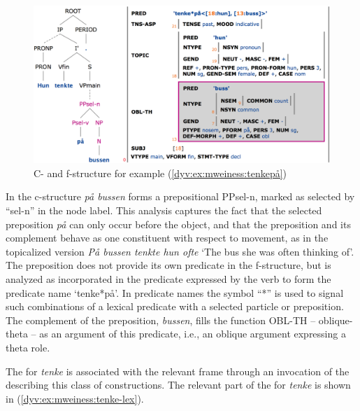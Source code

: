 \documentclass[output=paper]{langsci/langscibook}
\begin{document}
\begin{figure}
  \includegraphics[width=\textwidth]{figures/selprepcons.png}
  \caption{C- and f-structure for example (\ref{dyv:ex:mweiness:tenkepå})}
  \label{dyv:fig:mweiness:selprepcons}
\end{figure}

In the c-structure \textit{på bussen} forms a prepositional  PPsel-n, marked as selected by ``sel-n'' in the node label.
This analysis captures the fact that the selected preposition \textit{på} can only occur before the object, and that the preposition and its complement behave as one constituent with respect to movement, as in the topicalized version \textit{På bussen tenkte hun ofte} `The bus she was often thinking of'.
The preposition does not provide its own predicate in the f-structure, but is analyzed as incorporated in the predicate expressed by the verb to form the predicate name `tenke*på'.
In predicate names the symbol ``*'' is used to signal such combinations of a lexical predicate with a selected particle or preposition.
The complement of the preposition, \textit{bussen}, fills the function OBL-TH -- oblique-theta -- as an argument of this predicate, i.e., an oblique argument expressing a theta role.

The  for \textit{tenke} is associated with the relevant frame through an invocation of the  describing this class of constructions.
The relevant part of the  for \textit{tenke} is shown in  (\ref{dyv:ex:mweiness:tenke-lex}).

\end{document}

